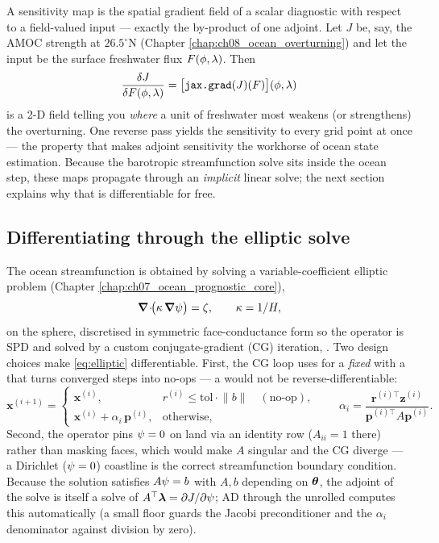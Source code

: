 A sensitivity map is the spatial gradient field of a scalar diagnostic with
respect to a field-valued input --- exactly the by-product of one adjoint.
Let $J$ be, say, the AMOC strength at $26.5^\circ$N (Chapter
\ref{chap:ch08_ocean_overturning}) and let the input be the surface freshwater
flux $F(\phi,\lambda)$. Then
\begin{equation}
  \frac{\delta J}{\delta F(\phi,\lambda)}
  = \big[\texttt{jax.grad}(J)(F)\big](\phi,\lambda)
  \label{eq:sensmap}
\end{equation}
is a 2-D field telling you \emph{where} a unit of freshwater most weakens (or
strengthens) the overturning. One reverse pass yields the sensitivity to every
grid point at once --- the property that makes adjoint sensitivity the workhorse
of ocean state estimation. Because the barotropic streamfunction solve sits
inside the ocean step, these maps propagate through an \emph{implicit} linear
solve; the next section explains why that is differentiable for free.

\subsection*{Differentiating through the elliptic solve}

The ocean streamfunction is obtained by solving a variable-coefficient elliptic
problem (Chapter \ref{chap:ch07_ocean_prognostic_core}),
\begin{equation}
  \boldsymbol{\nabla}\!\cdot\!\!\big(\kappa\,\boldsymbol{\nabla}\psi\big) = \zeta,
  \qquad \kappa = 1/H,
  \label{eq:elliptic}
\end{equation}
on the sphere, discretised in symmetric face-conductance form so the operator is
SPD and solved by a custom conjugate-gradient (CG) iteration,
. Two design choices make \eqref{eq:elliptic} differentiable.
First, the CG loop uses  for a \emph{fixed} 
with a  that turns converged steps into no-ops --- a
 would not be reverse-differentiable:
\begin{equation}
  \mathbf{x}^{(i+1)} =
  \begin{cases}
    \mathbf{x}^{(i)}, & r^{(i)} \le \mathrm{tol}\cdot\lVert b\rVert \quad(\text{no-op}),\\[2pt]
    \mathbf{x}^{(i)} + \alpha_i\,\mathbf{p}^{(i)}, & \text{otherwise},
  \end{cases}
  \qquad
  \alpha_i = \frac{\mathbf{r}^{(i)\!\top}\mathbf{z}^{(i)}}{\mathbf{p}^{(i)\!\top}A\mathbf{p}^{(i)}}.
  \label{eq:cgstep}
\end{equation}
Second, the operator pins $\psi=0$ on land via an identity row
($A_{ii}=1$ there) rather than masking faces, which would make $A$ singular and
the CG diverge --- a Dirichlet ($\psi=0$) coastline is the correct
streamfunction boundary condition. Because the solution satisfies $A\psi=b$
with $A,b$ depending on $\boldsymbol{\theta}$, the adjoint of the solve is itself a solve of
$A^{\top}\boldsymbol{\lambda}=\partial J/\partial\psi$; AD through the unrolled
 computes this automatically (a small floor  guards the
Jacobi preconditioner and the $\alpha_i$ denominator against division by zero).

